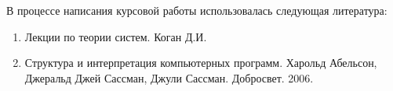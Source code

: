 
В процессе написания курсовой работы использовалась следующая литература:

\begin{enumerate}
\item{Лекции по теории систем. Коган Д.И.}
\item{Структура и интерпретация компьютерных программ. Харольд Абельсон, Джеральд Джей Сассман, Джули Сассман. Добросвет. 2006.}
\end{enumerate}
